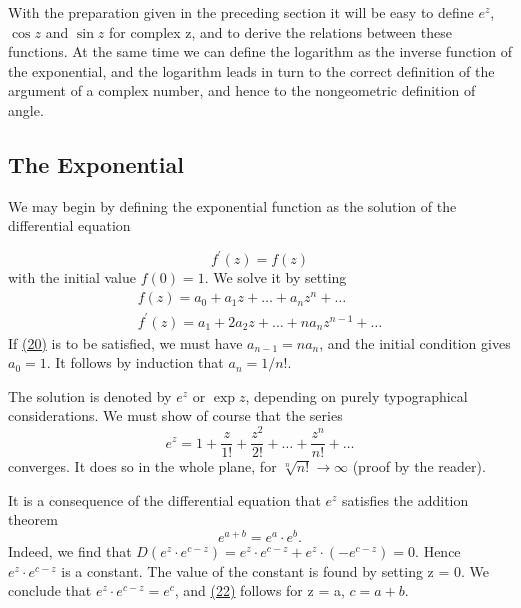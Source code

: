 With the preparation given in the preceding section it will be easy to define $e^{z}$, $\cos z$ and $\sin z$ for complex z, and to derive the relations between these functions. At the same time we can define the logarithm as the inverse function of the exponential, and the logarithm leads in turn to the correct definition of the argument of a complex number, and hence to the nongeometric definition of angle.

\setcounter{section}{3}\setcounter{subsection}{0}\subsection{The Exponential}\label{sec:2.3.1}
We may begin by defining the exponential function as the solution of the differential equation


\begin{equation*}
f ^ {\prime} (z) = f (z)\tag{20}\label{eq:2.20}
\end{equation*}
with the initial value $f(0) = 1$. We solve it by setting
\begin{equation*}
\begin{array}{l} f (z) = a _ {0} + a _ {1} z + \dots + a _ {n} z ^ {n} + \dots \\ f ^ {\prime} (z) = a _ {1} + 2 a _ {2} z + \dots + n a _ {n} z ^ {n - 1} + \dots \end{array}
\end{equation*}
If \hyperref[eq:2.20]{(20)} is to be satisfied, we must have $a_{n-1} = na_n$, and the initial condition gives $a_0 = 1$. It follows by induction that $a_n = 1/n!$.

The solution is denoted by $e^{z}$ or $\exp z$, depending on purely typographical considerations. We must show of course that the series
\begin{equation*}
e ^ {z} = 1 + \frac {z}{1 !} + \frac {z ^ {2}}{2 !} + \dots + \frac {z ^ {n}}{n !} + \dots\tag{21}\label{eq:2.21}
\end{equation*}
converges. It does so in the whole plane, for $\sqrt[n]{n!} \to \infty$ (proof by the reader).

It is a consequence of the differential equation that $e^{z}$ satisfies the addition theorem
\begin{equation*}
e ^ {a + b} = e ^ {a} \cdot e ^ {b}.\tag{22}\label{eq:2.22}
\end{equation*}
Indeed, we find that $D(e^{z} \cdot e^{c-z}) = e^{z} \cdot e^{c-z} + e^{z} \cdot (-e^{c-z}) = 0$. Hence $e^{z} \cdot e^{c-z}$ is a constant. The value of the constant is found by setting z = 0. We conclude that $e^{z} \cdot e^{c-z} = e^{c}$, and \hyperref[eq:2.22]{(22)} follows for z = a, $c = a + b$.

